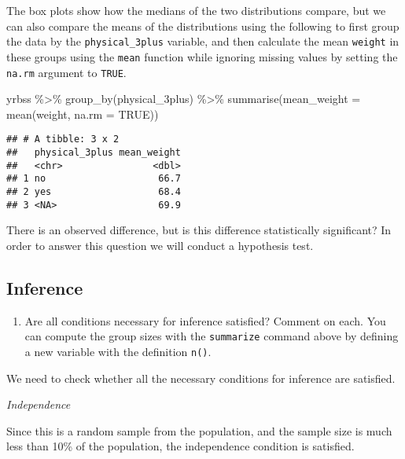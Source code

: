 \documentclass[
]{article}
\newenvironment{Shaded}{\begin{snugshade}}{\end{snugshade}}
\newcommand{\AttributeTok}[1]{\textcolor[rgb]{0.77,0.63,0.00}{#1}}
\newcommand{\ConstantTok}[1]{\textcolor[rgb]{0.00,0.00,0.00}{#1}}
\newcommand{\FunctionTok}[1]{\textcolor[rgb]{0.00,0.00,0.00}{#1}}
\newcommand{\NormalTok}[1]{#1}
\newcommand{\SpecialCharTok}[1]{\textcolor[rgb]{0.00,0.00,0.00}{#1}}
\providecommand{\tightlist}{%
  \setlength{\itemsep}{0pt}\setlength{\parskip}{0pt}}
\begin{document}
The box plots show how the medians of the two distributions compare, but
we can also compare the means of the distributions using the following
to first group the data by the \texttt{physical\_3plus} variable, and
then calculate the mean \texttt{weight} in these groups using the
\texttt{mean} function while ignoring missing values by setting the
\texttt{na.rm} argument to \texttt{TRUE}.

\begin{Shaded}
\begin{Highlighting}[]
\NormalTok{yrbss }\SpecialCharTok{\%\textgreater{}\%}
  \FunctionTok{group\_by}\NormalTok{(physical\_3plus) }\SpecialCharTok{\%\textgreater{}\%}
  \FunctionTok{summarise}\NormalTok{(}\AttributeTok{mean\_weight =} \FunctionTok{mean}\NormalTok{(weight, }\AttributeTok{na.rm =} \ConstantTok{TRUE}\NormalTok{))}
\end{Highlighting}
\end{Shaded}

\begin{verbatim}
## # A tibble: 3 x 2
##   physical_3plus mean_weight
##   <chr>                <dbl>
## 1 no                    66.7
## 2 yes                   68.4
## 3 <NA>                  69.9
\end{verbatim}

There is an observed difference, but is this difference statistically
significant? In order to answer this question we will conduct a
hypothesis test.

\hypertarget{inference}{%
\subsection{Inference}\label{inference}}

\begin{enumerate}
\def\labelenumi{\arabic{enumi}.}
\setcounter{enumi}{3}
\tightlist
\item
  Are all conditions necessary for inference satisfied? Comment on each.
  You can compute the group sizes with the \texttt{summarize} command
  above by defining a new variable with the definition \texttt{n()}.
\end{enumerate}

We need to check whether all the necessary conditions for inference are
satisfied.

\emph{Independence}

Since this is a random sample from the population, and the sample size
is much less than 10\% of the population, the independence condition is
satisfied.
\end{document}
